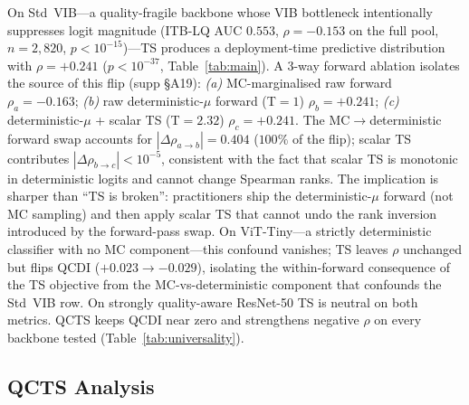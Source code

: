 \documentclass{bmvc2k}
\begin{document}
On Std~VIB---a quality-fragile backbone whose VIB bottleneck intentionally suppresses logit magnitude (ITB-LQ AUC $0.553$, $\rho{=}-0.153$ on the full pool, $n{=}2{,}820$, $p{<}10^{-15}$)---TS produces a deployment-time predictive distribution with $\rho{=}+0.241$ ($p{<}10^{-37}$, Table~\ref{tab:main}). A 3-way forward ablation isolates the source of this flip (supp \S A19): \emph{(a)} MC-marginalised raw forward $\rho_a{=}{-}0.163$; \emph{(b)} raw deterministic-$\mu$ forward (T${=}1$) $\rho_b{=}{+}0.241$; \emph{(c)} deterministic-$\mu$ + scalar TS (T${=}2.32$) $\rho_c{=}{+}0.241$. The MC$\to$deterministic forward swap accounts for $|\Delta\rho_{a\to b}|{=}0.404$ ($100\%$ of the flip); scalar TS contributes $|\Delta\rho_{b\to c}|{<}10^{-5}$, consistent with the fact that scalar TS is monotonic in deterministic logits and cannot change Spearman ranks. The implication is sharper than ``TS is broken'': practitioners ship the deterministic-$\mu$ forward (not MC sampling) and then apply scalar TS that cannot undo the rank inversion introduced by the forward-pass swap. On ViT-Tiny---a strictly deterministic classifier with no MC component---this confound vanishes; TS leaves $\rho$ unchanged but flips QCDI ($+0.023\to-0.029$), isolating the within-forward consequence of the TS objective from the MC-vs-deterministic component that confounds the Std~VIB row. On strongly quality-aware ResNet-50 TS is neutral on both metrics. QCTS keeps QCDI near zero and strengthens negative $\rho$ on every backbone tested (Table~\ref{tab:universality}).



\subsection{QCTS Analysis}
\label{sec:qcts_analysis}
\end{document}
